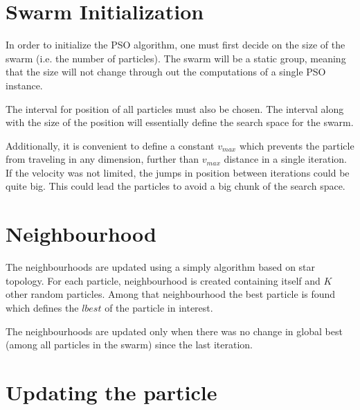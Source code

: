 \documentclass{mini}
\begin{document}


\section{Swarm Initialization}
In order to initialize the PSO algorithm, one must first decide on the size of the swarm (i.e. the number of particles). The swarm will be a static group, meaning that the size will not change through out the computations of a single PSO instance.

The interval for position of all particles must also be chosen. The interval along with the size of the position will essentially define the search space for the swarm.

Additionally, it is convenient to define a constant $v_{max}$ which prevents the particle from traveling in any dimension, further than $v_{max}$ distance in a single iteration. If the velocity was not limited, the jumps in position between iterations could be quite big. This could lead the particles to avoid a big chunk of the search space.


\section{Neighbourhood}

The neighbourhoods are updated using a simply algorithm based on star topology.
For each particle, neighbourhood is created containing itself and $K$ other random particles. Among that neighbourhood the best particle is found which defines the $lbest$ of the particle in interest.

The neighbourhoods are updated only when there was no change in global best (among all particles in the swarm) since the last iteration.


\section{Updating the particle}
\end{document}

